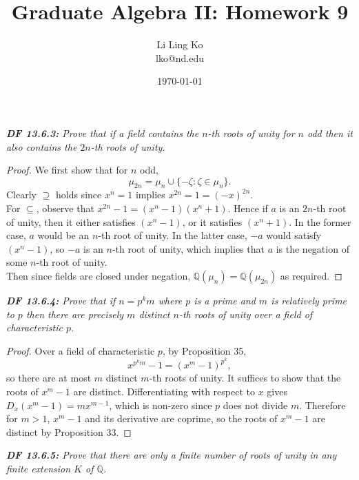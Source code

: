\documentclass{article}
\begin{document}
\title{Graduate Algebra II: Homework 9}
\author{Li Ling Ko\\ lko@nd.edu}
\date{\today}
\maketitle

\it \textbf{DF 13.6.3:} Prove that if a field contains the $n$-th roots of
  unity for $n$ odd then it also contains the $2n$-th roots of unity.

  \begin{proof}
    We first show that for $n$ odd,
    \[\mu_{2n} =\mu_n \cup \{-\zeta:\zeta\in\mu_n\}.\]
    Clearly $\supseteq$ holds since $x^n=1$ implies $x^{2n}=1=(-x)^{2n}$.
    \\

    For $\subseteq$, observe that $x^{2n}-1=(x^n-1)(x^n+1)$. Hence if $a$
    is an $2n$-th root of unity, then it either satisfies $(x^n-1)$, or it
    satisfies $(x^n+1)$. In the former case, $a$ would be an $n$-th root of
    unity. In the latter case, $-a$ would satisfy $(x^n-1)$, so $-a$ is an
    $n$-th root of unity, which implies that $a$ is the negation of some
    $n$-th root of unity. \\

    Then since fields are closed under negation,
    $\mathbb{Q}(\mu_n)=\mathbb{Q}(\mu_{2n})$ as required.
  \end{proof}

\it \textbf{DF 13.6.4:} Prove that if $n=p^km$ where $p$ is a prime and $m$
  is relatively prime to $p$ then there are precisely $m$ distinct $n$-th
  roots of unity over a field of characteristic $p$.

  \begin{proof}
    Over a field of characteristic $p$, by Proposition 35,
    \[x^{p^km}-1 =(x^m-1)^{p^k},\]
    so there are at most $m$ distinct $m$-th roots of unity. It suffices to
    show that the roots of $x^m-1$ are distinct. Differentiating with
    respect to $x$ gives $D_x(x^m-1)=mx^{m-1}$, which is non-zero since $p$
    does not divide $m$. Therefore for $m>1$, $x^m-1$ and its derivative
    are coprime, so the roots of $x^m-1$ are distinct by Proposition 33.
  \end{proof}

\it \textbf{DF 13.6.5:} Prove that there are only a finite number of roots
  of unity in any finite extension $K$ of $\mathbb{Q}$.
\end{document}
